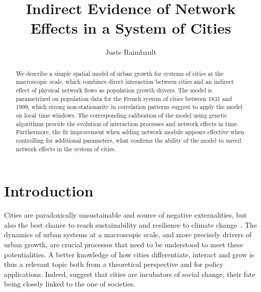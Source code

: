 \documentclass[Royal,sageh,times]{sagej}
\begin{document}

\title{Indirect Evidence of Network Effects in a System of Cities}

\author{Juste Raimbault}








\begin{abstract}
We describe a simple spatial model of urban growth for systems of cities at the macroscopic scale, which combines direct interaction between cities and an indirect effect of physical network flows as population growth drivers. The model is parametrized on population data for the French system of cities between 1831 and 1999, which strong non-stationarity in correlation patterns suggest to apply the model on local time windows. The corresponding calibration of the model using genetic algorithms provide the evolution of interaction processes and network effects in time. Furthermore, the fit improvement when adding network module appears effective when controlling for additional parameters, what confirms the ability of the model to unveil network effects in the system of cities.
\end{abstract}


\maketitle







\section*{Introduction}


Cities are paradoxically unsustainable and source of negative externalities, but also the best chance to reach sustainability and resilience to climate change~\citep{glaeser2011triumph}. The dynamics of urban systems at a macroscopic scale, and more precisely drivers of urban growth, are crucial processes that need to be understood to meet these potentialities. A better knowledge of how cities differentiate, interact and grow is thus a relevant topic both from a theoretical perspective and for policy applications. Indeed, \cite{pumain2009innovation} suggest that cities are incubators of social change, their fate being closely linked to the one of societies. 
\end{document}
